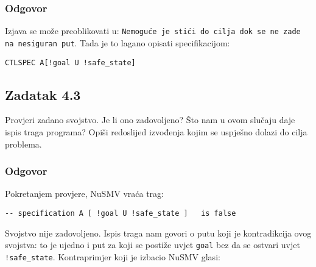 \documentclass{article}
\newcommand{\code}[1]{\colorbox{blue!15}{\texttt{#1}}}
\newcommand{\odgovor}{\subsubsection*{Odgovor}}
\newcommand{\zadatak}[1]{\subsection{Zadatak #1}}
\begin{document}
\odgovor

Izjava se može preoblikovati u: \newline
\code{Nemoguće je stići do cilja dok se ne zađe na nesiguran put}. Tada je to lagano opisati specifikacijom:

\begin{verbatim}
CTLSPEC A[!goal U !safe_state]
\end{verbatim}


\zadatak{4.3}

Provjeri zadano svojstvo. Je li ono zadovoljeno? Što nam u ovom slučaju daje ispis traga programa? Opiši redoslijed izvođenja kojim se uspješno dolazi do cilja problema. 

\odgovor

Pokretanjem provjere, NuSMV vraća trag:

\begin{verbatim}
-- specification A [ !goal U !safe_state ]   is false
\end{verbatim}

\noindent
Svojstvo nije zadovoljeno. Ispis traga nam govori o putu koji je kontradikcija ovog svojstva: to je ujedno i put za koji se postiže uvjet \code{goal} bez da se ostvari uvjet \code{!safe\_state}. Kontraprimjer koji je izbacio NuSMV glasi:
\end{document}
